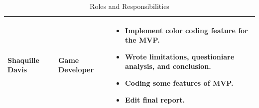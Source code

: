 \documentclass{sigchi}
\begin{document}
\begin{table}[h!]
\begin{tabular}{>{\raggedright}p{4cm}|>{\raggedright}p{4cm}|>{\raggedright}p{6cm}}
Shaquille Davis &
Game Developer &
\begin{itemize}[leftmargin=.15in, nosep]
\item Implement color coding feature for the MVP.
\item Wrote limitations, questioniare analysis, and conclusion.
\item Coding some features of MVP.
\item Edit final report.
\end{itemize} \tabularnewline \hline

\end{tabular}
\caption{Roles and Responsibilities}
\label{tab:role}
\end{table}
\end{document}
